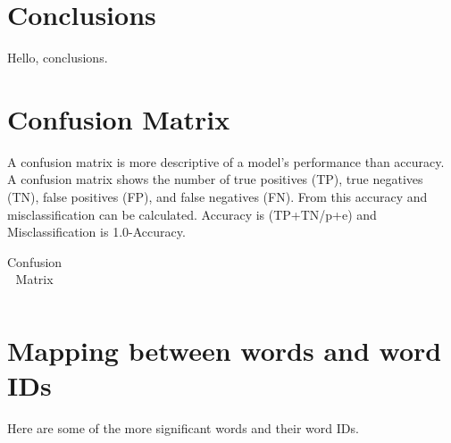 \documentclass{IEEEtran}
\begin{document}
\section{Conclusions}
Hello, conclusions.

\printbibliography

\newpage
\onecolumn
\appendix
\section{Confusion Matrix}

A confusion matrix is more descriptive of a model's performance than accuracy. A confusion matrix shows the number of true positives (TP), true negatives (TN), false positives (FP), and false negatives (FN). From this accuracy and misclassification can be calculated. Accuracy is (TP+TN/p+e) and Misclassification is 1.0-Accuracy.

\begin{table}[ht]
  \caption{Confusion Matrix}
  \centering
  \begin{tabular}{c c c }
   \hline\hline
   



  \end{tabular}
  \label{table:confmatrix}
\end{table}

\newpage
\onecolumn
\section{Mapping between words and word IDs}
Here are some of the more significant words and their word IDs.
\end{document}
